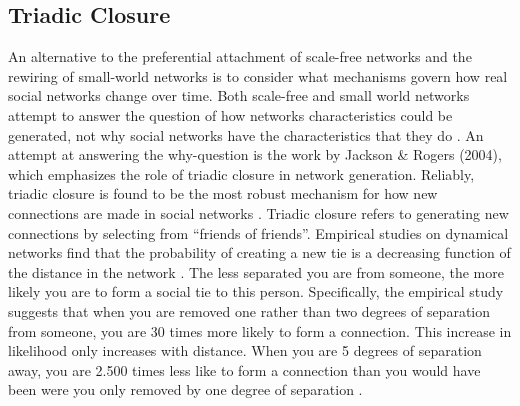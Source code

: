 \documentclass{article}
\begin{document}
\subsection{Triadic Closure}
An alternative to the preferential attachment of scale-free networks and the rewiring of small-world networks is to consider what mechanisms govern how real social networks change over time. Both scale-free and small world networks attempt to answer the question of how networks characteristics could be generated, not why social networks have the characteristics that they do \cite{jackson_search_2004}. An attempt at answering the why-question is the work by Jackson \& Rogers (2004), which emphasizes the role of triadic closure in network generation. Reliably, triadic closure is found to be the most robust mechanism for how new connections are made in social networks \cite{asikainen_cumulative_2020,bianconi_triadic_2014,kossinets_origins_2009,peixoto_disentangling_2022}. Triadic closure refers to generating new connections by selecting from “friends of friends”. Empirical studies on dynamical networks find that the probability of creating a new tie is a decreasing function of the distance in the network \cite{bener_empirical_2016,kossinets_origins_2009}. The less separated you are from someone, the more likely you are to form a social tie to this person. Specifically, the empirical study suggests that when you are removed one rather than two degrees of separation from someone, you are 30 times more likely to form a connection. This increase in likelihood only increases with distance. When you are 5 degrees of separation away, you are 2.500 times less like to form a connection than you would have been were you only removed by one degree of separation \cite{kossinets_origins_2009}. 
\end{document}
